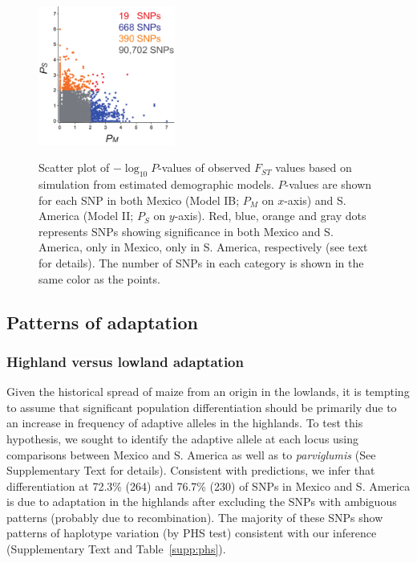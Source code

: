 \begin{figure}[tb]   
  \begin{center}
   \vspace{-0mm}
   \includegraphics[width=0.4\textwidth]{fig/Fig6}
   \renewcommand{\baselinestretch}{0.9}
   \vspace{-3mm}
   \caption{Scatter plot of $-\log_10 P$-values of observed $F_{ST}$ values based on simulation from estimated demographic models. $P$-values are shown for each SNP in both Mexico (Model IB; $P_M$ on $x$-axis) and S. America (Model II; $P_S$ on $y$-axis).  
   Red, blue, orange and gray dots represents SNPs showing significance in both Mexico and S. America, only in Mexico, only in S. America, respectively (see text for details).
   The number of SNPs in each category is shown in the same color as the points.} 
\vspace{-6mm}
    \label{PvDist}
  \end{center}
\end{figure}
%

\subsection*{Patterns of adaptation}

\subsubsection{Highland versus lowland adaptation}  

Given the historical spread of maize from an origin in the lowlands, it is tempting to assume that significant population differentiation should be primarily due to an increase in frequency of adaptive alleles in the highlands.
To test this hypothesis, we sought to identify the adaptive allele at each locus using comparisons between Mexico and S. America as well as to \emph{parviglumis} (See Supplementary Text  for details).  
Consistent with predictions, we infer that differentiation at 72.3\% (264) and 76.7\% (230) of SNPs in Mexico and S. America is due to adaptation in the highlands after excluding the SNPs with ambiguous patterns (probably due to recombination). 
The majority of these SNPs show patterns of haplotype variation (by PHS test) consistent with our inference (Supplementary Text and Table~\ref{supp:phs}).


